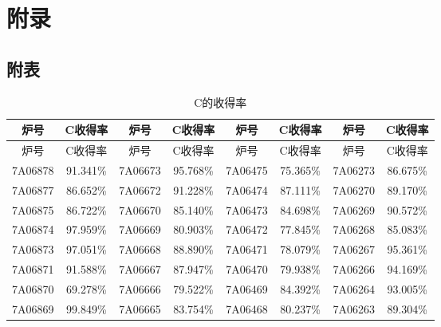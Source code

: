 \documentclass[12pt]{article}%
\begin{document}
\section{附录}
\renewcommand\appendix{\setcounter{secnumdepth}{4}}
\renewcommand\thesubsection{\fontsize{12pt}{1}附录\arabic{subsection}}
\subsection{附表}
\begin{longtable}{|cc|cc|cc|cc|}
    \caption{C的收得率}
    \label{table:C}  \\ %
    \hline
炉号 & {C收得率} & 炉号 & {C收得率} & 炉号 & {C收得率} & {炉号} & {C收得率} \\
\hline \endfirsthead
\hline
炉号 & {C收得率} & 炉号 & {C收得率} & 炉号 & {C收得率} &{炉号} & {C收得率} \\
\hline
\endhead
\hline
    \endfoot
7A06878              & 91.341\% & 7A06673              & 95.768\% & 7A06475              & 75.365\% & \multicolumn{1}{l}{7A06273             } & 86.675\% \\
7A06877              & 86.652\% & 7A06672              & 91.228\% & 7A06474              & 87.111\% & \multicolumn{1}{l}{7A06270             } & 89.170\% \\
7A06875              & 86.722\% & 7A06670              & 85.140\% & 7A06473              & 84.698\% & \multicolumn{1}{l}{7A06269             } & 90.572\% \\
7A06874              & 97.959\% & 7A06669              & 80.903\% & 7A06472              & 77.845\% & \multicolumn{1}{l}{7A06268             } & 85.083\% \\
7A06873              & 97.051\% & 7A06668              & 88.890\% & 7A06471              & 78.079\% & \multicolumn{1}{l}{7A06267             } & 95.361\% \\
7A06871              & 91.588\% & 7A06667              & 87.947\% & 7A06470              & 79.938\% & \multicolumn{1}{l}{7A06266             } & 94.169\% \\
7A06870              & 69.278\% & 7A06666              & 79.522\% & 7A06469              & 84.392\% & \multicolumn{1}{l}{7A06264             } & 93.005\% \\
7A06869              & 99.849\% & 7A06665              & 83.754\% & 7A06468              & 80.237\% & \multicolumn{1}{l}{7A06263             } & 89.304\% \\

\end{longtable}
\end{document}
